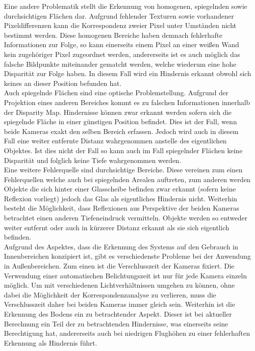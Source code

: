 \noindent
Eine andere Problematik stellt die Erkennung von homogenen, spiegelnden sowie durchsichtigen Flächen dar. Aufgrund fehlender Texturen sowie vorhandener Pixeldifferenzen kann die Korrespondenz zweier Pixel unter Umständen nicht bestimmt werden. Diese homogenen Bereiche haben demnach fehlerhafte Informationen zur Folge, so kann  einerseits einem Pixel an einer weißen Wand kein zugehöriger Pixel zugeordnet werden, andererseits ist es auch möglich das falsche Bildpunkte miteinander gematcht werden, welche wiederum eine hohe Disparität zur Folge haben. In diesem Fall wird ein Hindernis erkannt obwohl sich keines an dieser Position befunden hat.\\
\noindent
Auch spiegelnde Flächen sind eine optische Problemstellung. Aufgrund der Projektion eines anderen Bereiches kommt es zu falschen Informationen innerhalb der Disparity Map. Hindernisse können zwar erkannt werden sofern sich die spiegelnde Fläche in einer günstigen Position befindet. Dies ist der Fall, wenn beide Kameras exakt den selben Bereich erfassen. Jedoch wird auch in diesem Fall eine weiter entfernte Distanz wahrgenommen anstelle des eigentlichen Objektes. Ist dies nicht der Fall so kann auch im Fall spiegelnder Flächen keine Disparität und folglich keine Tiefe wahrgenommen werden.\\
\noindent
Eine weitere Fehlerquelle sind durchsichtige Bereiche. Diese vereinen zum einen Fehlerquellen welche auch bei spiegelnden Arealen auftreten, zum anderen werden Objekte die sich hinter einer Glasscheibe befinden zwar erkannt (sofern keine Reflexion vorliegt) jedoch das Glas als eigentliches Hindernis nicht. Weiterhin besteht die Möglichkeit, dass Reflexionen aus Perspektive der beiden Kameras betrachtet einen anderen Tiefeneindruck vermitteln. Objekte werden so entweder weiter entfernt oder auch in kürzerer Distanz erkannt als sie sich eigentlich befinden.\\

\noindent
Aufgrund des Aspektes, dass die Erkennung des Systems auf den Gebrauch in Innenbereichen konzipiert ist, gibt es verschiedenste Probleme bei der Anwendung in Außenbereichen. Zum einen ist die Verschlusszeit der Kameras fixiert. Die Verwendung einer automatischen Belichtungszeit ist nur für jede Kamera einzeln möglich. Um mit verschiedenen Lichtverhältnissen umgehen zu können, ohne dabei die Möglichkeit der Korrespondenzanalyse zu verlieren, muss die Verschlusszeit daher bei beiden Kameras immer gleich sein. Weiterhin ist die Erkennung des Bodens ein zu betrachtender Aspekt. Dieser ist bei aktueller Berechnung ein Teil der zu betrachtenden Hindernisse, was einerseits seine Berechtigung hat, andererseits auch bei niedrigen Flughöhen zu einer fehlerhaften Erkennung als Hindernis führt. 


